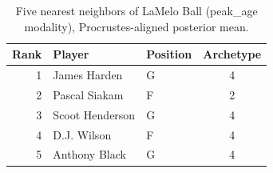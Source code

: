 \begin{table}[htbp]
  \centering\small
  \begin{tabular}{rllc}
    \toprule
    Rank & Player & Position & Archetype \\
    \midrule
    1 & James Harden & G & 4 \\
    2 & Pascal Siakam & F & 2 \\
    3 & Scoot Henderson & G & 4 \\
    4 & D.J. Wilson & F & 4 \\
    5 & Anthony Black & G & 4 \\
    \bottomrule
  \end{tabular}
  \caption{Five nearest neighbors of LaMelo Ball (peak_age modality), Procrustes-aligned posterior mean.}
  \label{tab:LaMelo_Ball_neighbors_peak_age}
\end{table}

